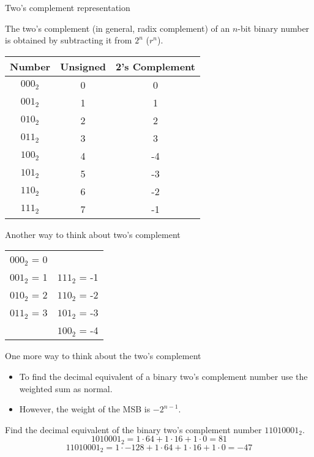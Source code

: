 \begin{frame}{Two's complement representation}
  \begin{definition}
    The \alert{two's complement} (in general, radix complement) of an $n$-bit binary number is obtained by subtracting it from $2^n$ ($r^n$).
  \end{definition}
  \begin{center}
    \begin{tabular}{c|cc}
      Number & Unsigned & 2's Complement \\
      \hline
      $000_2$ & 0 & 0 \\
      $001_2$ & 1 & 1 \\
      $010_2$ & 2 & 2 \\
      $011_2$ & 3 & 3 \\
      $100_2$ & 4 & -4 \\
      $101_2$ & 5 & -3 \\
      $110_2$ & 6 & -2 \\
      $111_2$ & 7 & -1 \\
    \end{tabular}
  \end{center}
\end{frame}

\begin{frame}{Another way to think about two's complement}
  \begin{center}
    \begin{tabular}{cc}
      $000_2$ = 0 & \\
      $001_2$ = 1 & $111_2$ = -1\\
      $010_2$ = 2 & $110_2$ = -2\\
      $011_2$ = 3 & $101_2$ = -3\\
                  & $100_2$ = -4 \\
    \end{tabular}
  \end{center}
\end{frame}

\begin{frame}{One more way to think about the two's complement}
  \begin{itemize}
    \item To find the decimal equivalent of a binary two's complement number use the weighted sum as normal.
    \item However, the weight of the MSB is $-2^{n-1}$.
  \end{itemize}
  \begin{example}
    Find the decimal equivalent of the binary two's complement number $11010001_2$.
    $$1010001_2 = 1 \cdot 64 + 1 \cdot 16 + 1 \cdot 0 = 81$$
    $$11010001_2 = 1 \cdot -128 + 1 \cdot 64 + 1 \cdot 16 + 1 \cdot 0 = -47$$
  \end{example}
\end{frame}

